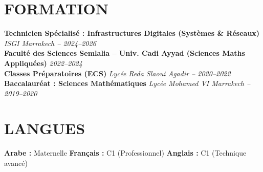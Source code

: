 \documentclass[10pt,a4paper]{article}
\begin{document}
\section*{FORMATION}
\noindent \textbf{Technicien Spécialisé : Infrastructures Digitales (Systèmes \& Réseaux)} \hfill \textit{ISGI Marrakech -- 2024--2026}\\
\noindent \textbf{Faculté des Sciences Semlalia -- Univ. Cadi Ayyad (Sciences Maths Appliquées)} \hfill \textit{2022--2024}\\
\noindent \textbf{Classes Préparatoires (ECS)} \hfill \textit{Lycée Reda Slaoui Agadir -- 2020--2022}\\
\noindent \textbf{Baccalauréat : Sciences Mathématiques} \hfill \textit{Lycée Mohamed VI Marrakech -- 2019--2020}

\section*{LANGUES}
\noindent \textbf{Arabe :} Maternelle \quad \textbar{} \quad \textbf{Français :} C1 (Professionnel) \quad \textbar{} \quad \textbf{Anglais :} C1 (Technique avancé)
\end{document}
